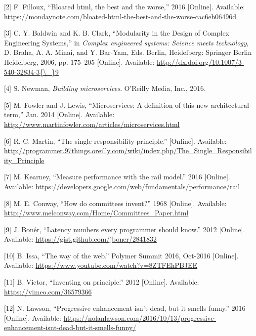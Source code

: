 \documentclass[]{article}
\begin{document}
\hypertarget{ref-Filloux2016}{}
{[}2{]} F. Filloux, ``Bloated html, the best and the worse,'' 2016
{[}Online{]}. Available:
\url{https://mondaynote.com/bloated-html-the-best-and-the-worse-cac6eb06496d}

\hypertarget{ref-Baldwin2006}{}
{[}3{]} C. Y. Baldwin and K. B. Clark, ``Modularity in the Design of
Complex Engineering Systems,'' in \emph{Complex engineered systems:
Science meets technology}, D. Braha, A. A. Minai, and Y. Bar-Yam, Eds.
Berlin, Heidelberg: Springer Berlin Heidelberg, 2006, pp. 175--205
{[}Online{]}. Available:
\href{http://dx.doi.org/10.1007/3-540-32834-3\%7B/_\%7D9}{http://dx.doi.org/10.1007/3-540-32834-3\{\textbackslash{}\_\}9}

\hypertarget{ref-Newman2015}{}
{[}4{]} S. Newman, \emph{Building microservices}. O'Reilly Media, Inc.,
2016.

\hypertarget{ref-Fowler2014}{}
{[}5{]} M. Fowler and J. Lewis, ``Microservices: A definition of this
new architectural term,'' Jan. 2014 {[}Online{]}. Available:
\url{http://www.martinfowler.com/articles/microservices.html}

\hypertarget{ref-Martin}{}
{[}6{]} R. C. Martin, ``The single responsibility principle.''
{[}Online{]}. Available:
\url{http://programmer.97things.oreilly.com/wiki/index.php/The_Single_Responsibility_Principle}

\hypertarget{ref-Kearney2016}{}
{[}7{]} M. Kearney, ``Measure performance with the rail model.'' 2016
{[}Online{]}. Available:
\url{https://developers.google.com/web/fundamentals/performance/rail}

\hypertarget{ref-Conway1968}{}
{[}8{]} M. E. Conway, ``How do committees invent?'' 1968 {[}Online{]}.
Available: \url{http://www.melconway.com/Home/Committees_Paper.html}

\hypertarget{ref-Boner2012}{}
{[}9{]} J. Bonér, ``Latency numbers every programmer should know.'' 2012
{[}Online{]}. Available: \url{https://gist.github.com/jboner/2841832}

\hypertarget{ref-Issa2016}{}
{[}10{]} B. Issa, ``The way of the web.'' Polymer Summit 2016, Oct-2016
{[}Online{]}. Available:
\url{https://www.youtube.com/watch?v=8ZTFEhPBJEE}

\hypertarget{ref-Victor2012}{}
{[}11{]} B. Victor, ``Inventing on principle.'' 2012 {[}Online{]}.
Available: \url{https://vimeo.com/36579366}

\hypertarget{ref-Lawson2016}{}
{[}12{]} N. Lawson, ``Progressive enhancement isn't dead, but it smells
funny.'' 2016 {[}Online{]}. Available:
\url{https://nolanlawson.com/2016/10/13/progressive-enhancement-isnt-dead-but-it-smells-funny/}
\end{document}
